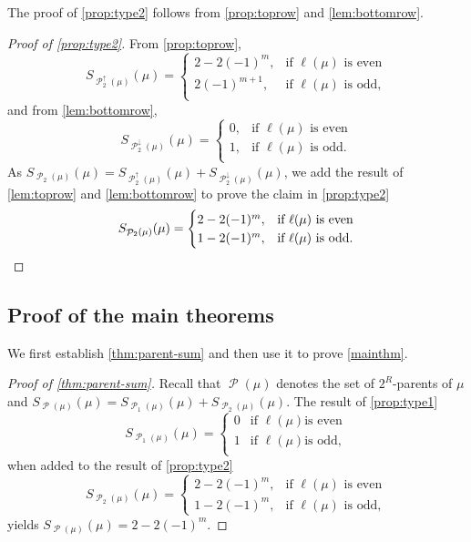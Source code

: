 \documentclass[12pt]{amsart}
\theoremstyle{definition}
\numberwithin{equation}{section}
\DeclareMathOperator{\p}{\mathcal{P}}
\begin{document}
The proof of \cref{prop:type2} follows from \cref{prop:toprow} and \cref{lem:bottomrow}.
\begin{proof}[Proof of \cref{prop:type2}]
From \cref{prop:toprow},
\[
S_{\p_2^\uparrow(\mu)}(\mu)
= \begin{cases}
2 - 2(-1)^m, &\text{if }\ell(\mu) \text{ is even}\\
2(-1)^{m+1}, & \text{if }\ell(\mu) \text{ is odd},\\
\end{cases}
\] and 
from \cref{lem:bottomrow},
\[
S_{\p_2^\downarrow(\mu)}(\mu) = \begin{cases}
0, &\text{if }\ell(\mu) \text{ is even}\\
1, &\text{if } \ell(\mu) \text{ is odd}.\\
\end{cases}
\]
As $S_{\p_2(\mu)}(\mu) = S_{\p_2^\uparrow(\mu)}(\mu) + S_{\p_2^\downarrow(\mu)}(\mu)$, we add the result of \cref{lem:toprow} and \cref{lem:bottomrow} to prove the claim in \cref{prop:type2}
\[
S_{\p_2(\mu)}(\mu) = \begin{cases}
2 - 2(-1)^{m}, &\text{if }\ell(\mu) \text{ is even}\\
1 - 2(-1)^{m}, & \text{if }\ell(\mu) \text{ is odd}.\qedhere\\
\end{cases}
\]
\end{proof}

\subsection{Proof of the main theorems}
We first establish \cref{thm:parent-sum} and then use it to prove \cref{mainthm}.
\begin{proof}[Proof of \cref{thm:parent-sum}]\label{pf:thm1}
Recall that $\p(\mu)$ denotes the set of $2^R$-parents of $\mu$ and $S_{\p(\mu)}(\mu) = S_{\p_1(\mu)}(\mu) + S_{\p_2(\mu)}(\mu)$. The result of \cref{prop:type1}
\[S_{\p_1(\mu)}(\mu) = \begin{cases}
    0 & \text{if } \ell(\mu) \text{is even}\\
    1 & \text{if } \ell(\mu) \text{is odd},\\
\end{cases}\]
 when added to the result of \cref{prop:type2}
 \[
S_{\p_2(\mu)}(\mu) = \begin{cases}
2 - 2(-1)^{m}, &\text{if }\ell(\mu) \text{ is even}\\
1 - 2(-1)^{m}, & \text{if }\ell(\mu) \text{ is odd},
\end{cases}
\]
yields $S_{\p(\mu)}(\mu) = 2 - 2(-1)^m$. 
\end{proof}
\end{document}
